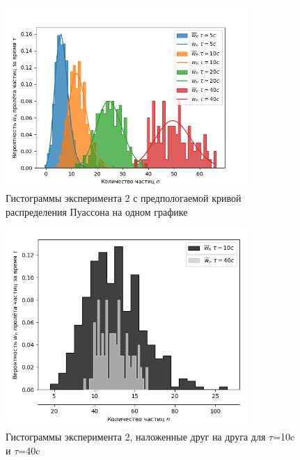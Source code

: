 \documentclass[12pt,a4paper]{article}
\begin{document}
\begin{figure}[!ht]
\includegraphics[width=0.825\textwidth]{imgs/all.png}
\caption{Гистограммы эксперимента 2 с предпологаемой кривой распределения Пуассона на одном графике}
\end{figure}
\begin{figure}[!ht]
\includegraphics[width=0.825\textwidth]{imgs/hist.png}
\caption{Гистограммы эксперимента 2, наложенные друг на друга для $\tau$=10c и $\tau$=40c}
\end{figure}

\newpage
\end{document}
